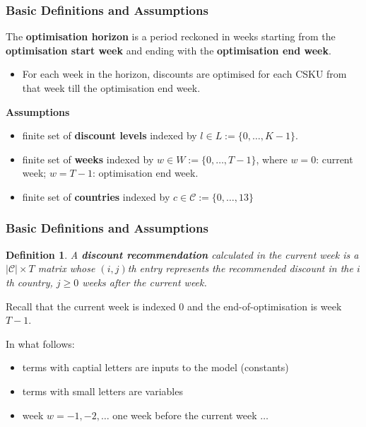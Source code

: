 \documentclass[xcolor=table]{beamer}
\newtheorem{defn}{Definition}
\begin{document}
\begin{frame}[t]
  \frametitle{Basic Definitions and Assumptions}
  \begin{definition}
  The \textcolor{orange2}{\textbf{optimisation horizon}} is a period reckoned in
  weeks starting from the \textcolor{orange2}{\textbf{optimisation start week}}
  and ending with the \textcolor{orange2}{\textbf{optimisation end week}}.
  \end{definition}
    \begin{itemize}
    \item For each week in the horizon, discounts are optimised for each CSKU from that
      week till the optimisation end week.
    \end{itemize}

\textbf{Assumptions}
    \begin{itemize}
      \item finite set of \textcolor{orange2}{\textbf{discount levels}} indexed
        by $l \in L := \{0, \ldots, K - 1\}$.
    \item finite set of \textcolor{orange2}{\textbf{weeks}} indexed by $w \in W
      := \{0 , \ldots, T - 1\}$,
      where $w = 0$: current week; $w = T - 1$: optimisation end week.
    \item finite set of \textcolor{orange2}{\textbf{countries}} indexed by $c
      \in \mathcal{C} := \{0, \ldots, 13\}$
  \end{itemize}
\end{frame}

\begin{frame}[t]
  \frametitle{Basic Definitions and Assumptions}
  \begin{defn}
  A \textcolor{orange2}{\textbf{discount recommendation}} calculated 
    in the current week is a $|\mathcal {C}| \times T$ matrix whose $(i, j)$th 
    entry represents the recommended discount in the $i$th country, 
    $j \geq 0$ weeks after the current week.
  \end{defn}

Recall that the current week is indexed $0$ and the end-of-optimisation is week
$T - 1$.

\bigskip

\pause

In what follows:
\begin{itemize}
  \item terms with captial letters are inputs to the model (constants)
  \item terms with small letters are variables
  \item week $w = -1, -2, \ldots$ one week before the current week $\ldots$ 
\end{itemize}
\end{frame}
\end{document}
